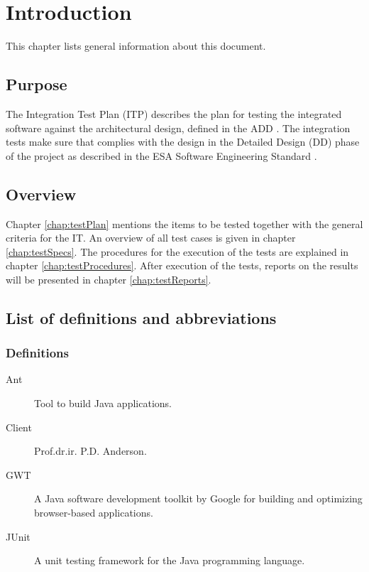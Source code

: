 \chapter{Introduction}
\label{chap:intro}
This chapter lists general information about this document.

\section{Purpose}
\label{sec:purpose}
The Integration Test Plan (ITP) describes the plan for testing the integrated software against the architectural design, defined in the ADD \cite{add}. The integration tests make sure that
\projectname{} complies with the design in the Detailed Design (DD) phase of the \projectname{} project as described in the ESA Software Engineering Standard \cite{esa}.

\section{Overview}
\label{sec:overview}
Chapter \ref{chap:testPlan} mentions the items to be tested together with the general criteria for the IT. An overview of all test cases is given in chapter \ref{chap:testSpecs}. The procedures for the execution of the tests are explained in chapter \ref{chap:testProcedures}. After execution of the tests, reports on the results will be presented in chapter \ref{chap:testReports}.

\section{List of definitions and abbreviations}
\label{sec:listofdef}

\subsection{Definitions}
\label{subsec:def}

\begin{description}
\item[Ant] Tool to build Java applications.
\item[Client] Prof.dr.ir. P.D. Anderson.
\item[GWT] A Java software development toolkit by Google for building and optimizing browser-based applications.
\item[JUnit] A unit testing framework for the Java programming language.
\end{description}

